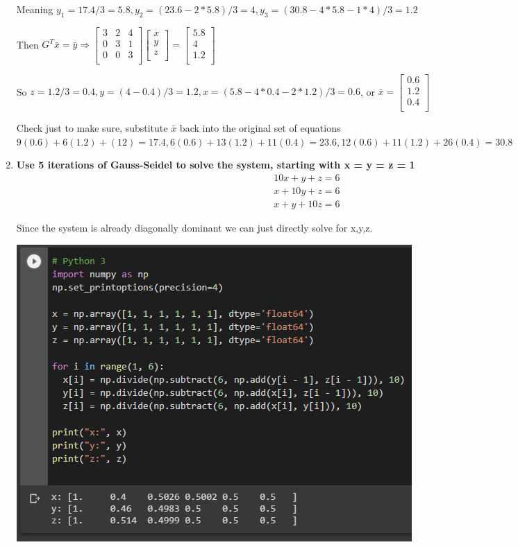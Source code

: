 \documentclass{article}
\begin{document}
\begin{enumerate}[1.]
Meaning $y_1 = 17.4/3 = 5.8, y_2 = (23.6 - 2 * 5.8)/3 = 4, y_3 = (30.8 - 4 * 5.8 - 1 * 4)/3 = 1.2$

Then $G^T\bar{x} = \bar{y} \Rightarrow \begin{bmatrix}
3 & 2 & 4 \\
0 & 3 & 1 \\
0 & 0 & 3 \\
\end{bmatrix}\begin{bmatrix}
x \\
y \\
z \\
\end{bmatrix} = \begin{bmatrix}
5.8 \\
4 \\
1.2 \\
\end{bmatrix}$

So $z = 1.2/3 = 0.4, y = (4 - 0.4)/3 = 1.2, x = (5.8 - 4 * 0.4 - 2 * 1.2)/3 = 0.6$, or $\bar{x} = \begin{bmatrix}
0.6 \\
1.2 \\
0.4 \\
\end{bmatrix}$

Check just to make sure, substitute $\bar{x}$ back into the original set of equations $9(0.6) + 6(1.2) + (12) = 17.4, 6 (0.6) + 13(1.2) + 11(0.4) = 23.6, 12(0.6) + 11(1.2) + 26(0.4) = 30.8$

\item \textbf{Use 5 iterations of Gauss-Seidel to solve the system, starting with x = y = z = 1
\begin{gather}
10x + y + z = 6 \\
x + 10y + z = 6 \\
x + y + 10z = 6
\end{gather}
}

Since the system is already diagonally dominant we can just directly solve for x,y,z.

\begin{center}
\includegraphics{a4_q3}
\end{center}


\end{enumerate}
\end{document}
